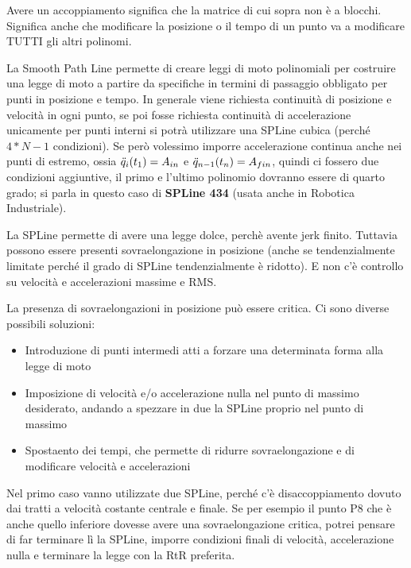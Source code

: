 Avere un accoppiamento significa che la matrice di cui sopra non è a blocchi. Significa anche che modificare la posizione o il tempo di un punto va a modificare TUTTI gli altri polinomi.


La Smooth Path Line permette di creare leggi di moto polinomiali per costruire una legge di moto a partire da specifiche in termini di passaggio obbligato per punti in posizione e tempo.
In generale viene richiesta continuità di posizione e velocità in ogni punto, se poi fosse richiesta continuità di accelerazione unicamente per punti interni si potrà utilizzare una SPLine cubica (perché \(4*N-1\) condizioni).
Se però volessimo imporre accelerazione continua anche nei punti di estremo, ossia \(\Ddot{q}_i(t_1)=A_{in}\) e \(\Ddot{q}_{n-1}(t_n)=A_{fin}\), quindi ci fossero due condizioni aggiuntive, il primo e l'ultimo polinomio dovranno essere di quarto grado; si parla in questo caso di \textbf{SPLine 434} (usata anche in Robotica Industriale).

La SPLine permette di avere una legge dolce, perchè avente jerk finito.
Tuttavia possono essere presenti sovraelongazione in posizione (anche se tendenzialmente limitate perché il grado di SPLine tendenzialmente è ridotto). E non c'è controllo su velocità e accelerazioni massime e RMS.

La presenza di sovraelongazioni in posizione può essere critica.
Ci sono diverse possibili soluzioni:
\begin{itemize}
    \item Introduzione di punti intermedi atti a forzare una determinata forma alla legge di moto
    \item Imposizione di velocità e/o accelerazione nulla nel punto di massimo desiderato, andando a spezzare in due la SPLine proprio nel punto di massimo
    \item Spostaento dei tempi, che permette di ridurre sovraelongazione e di modificare velocità e accelerazioni
\end{itemize}

Nel primo caso vanno utilizzate due SPLine, perché c'è disaccoppiamento dovuto dai tratti a velocità costante centrale e finale. Se per esempio il punto P8 che è anche quello inferiore dovesse avere una sovraelongazione critica, potrei pensare di far terminare lì la SPLine, imporre condizioni finali di velocità, accelerazione nulla e terminare la legge con la RtR preferita.

